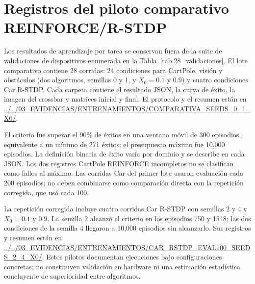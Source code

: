 \section{Registros del piloto comparativo REINFORCE/R-STDP}
\label{sec:anexo_piloto_rstdp}

Los resultados de aprendizaje por tarea se conservan fuera de la suite de
validaciones de dispositivos enumerada en la Tabla~\ref{tab:28_validaciones}.
El lote comparativo contiene 28 corridas: 24 condiciones para CartPole,
visi\'on y obst\'aculos (dos algoritmos, semillas 0 y 1, y $X_0=0.1$ y
$0.9$) y cuatro condiciones Car R-STDP. Cada carpeta contiene el resultado
JSON, la curva de {\'e}xito, la imagen del crossbar y matrices inicial y final.
El protocolo y el resumen est\'an en
\url{../../03_EVIDENCIAS/ENTRENAMIENTOS/COMPARATIVA_SEEDS_0_1_X0/}.

El criterio fue superar el 90\% de {\'e}xitos en una ventana m\'ovil de 300
episodios, equivalente a un m\'inimo de 271 {\'e}xitos; el presupuesto
m\'aximo fue 10,000 episodios. La definici\'on binaria de {\'e}xito var\'ia
por dominio y se describe en cada JSON. Los dos registros CartPole REINFORCE
incompletos no se clasifican como fallos al m\'aximo. Las corridas Car del
primer lote usaron evaluaci\'on cada 200 episodios; no deben combinarse como
comparaci\'on directa con la repetici\'on corregida, que us\'o cada 100.

La repetici\'on corregida incluye cuatro corridas Car R-STDP con semillas 2
y 4 y $X_0=0.1$ y $0.9$. La semilla 2 alcanz\'o el criterio en los episodios
750 y 1548; las dos condiciones de la semilla 4 llegaron a 10,000 episodios
sin alcanzarlo. Sus registros y resumen est\'an en
\url{../../03_EVIDENCIAS/ENTRENAMIENTOS/CAR_RSTDP_EVAL100_SEEDS_2_4_X0/}.
Estos pilotos documentan ejecuciones bajo configuraciones concretas; no
constituyen validaci\'on en hardware ni una estimaci\'on estad\'istica
concluyente de superioridad entre algoritmos.
